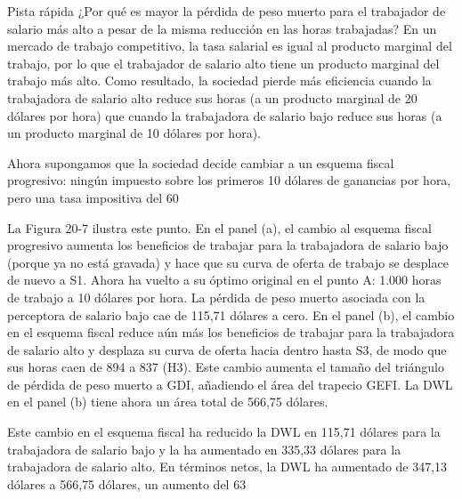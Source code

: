 \documentclass[10pt,a4paper]{article}
\begin{document}
Pista rápida ¿Por qué es mayor la pérdida de peso muerto para el trabajador de salario más alto a pesar de la misma reducción en las horas trabajadas? En un mercado de trabajo competitivo, la tasa salarial es igual al producto marginal del trabajo, por lo que el trabajador de salario alto tiene un producto marginal del trabajo más alto. Como resultado, la sociedad pierde más eficiencia cuando la trabajadora de salario alto reduce sus horas (a un producto marginal de 20 dólares por hora) que cuando la trabajadora de salario bajo reduce sus horas (a un producto marginal de 10 dólares por hora).

Ahora supongamos que la sociedad decide cambiar a un esquema fiscal progresivo: ningún impuesto sobre los primeros 10 dólares de ganancias por hora, pero una tasa impositiva del 60%

La Figura 20-7 ilustra este punto. En el panel (a), el cambio al esquema fiscal progresivo aumenta los beneficios de trabajar para la trabajadora de salario bajo (porque ya no está gravada) y hace que su curva de oferta de trabajo se desplace de nuevo a S1. Ahora ha vuelto a su óptimo original en el punto A: 1.000 horas de trabajo a 10 dólares por hora. La pérdida de peso muerto asociada con la perceptora de salario bajo cae de 115,71 dólares a cero. En el panel (b), el cambio en el esquema fiscal reduce aún más los beneficios de trabajar para la trabajadora de salario alto y desplaza su curva de oferta hacia dentro hasta S3, de modo que sus horas caen de 894 a 837 (H3). Este cambio aumenta el tamaño del triángulo de pérdida de peso muerto a GDI, añadiendo el área del trapecio GEFI. La DWL en el panel (b) tiene ahora un área total de 566,75 dólares.

Este cambio en el esquema fiscal ha reducido la DWL en 115,71 dólares para la trabajadora de salario bajo y la ha aumentado en 335,33 dólares para la trabajadora de salario alto. En términos netos, la DWL ha aumentado de 347,13 dólares a 566,75 dólares, un aumento del 63%
\end{document}
